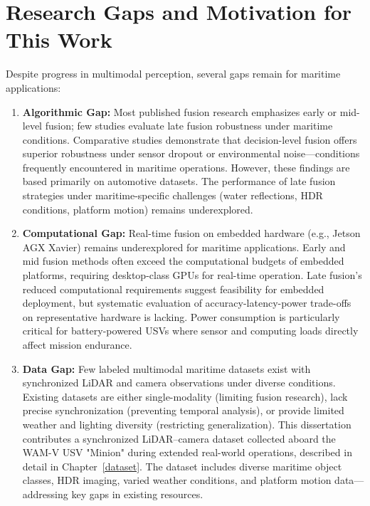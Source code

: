 \documentclass{erauthesis}
\begin{document}

\section{Research Gaps and Motivation for This Work}

Despite progress in multimodal perception, several gaps remain for maritime applications:

\begin{enumerate}
    \item \textbf{Algorithmic Gap:} Most published fusion research emphasizes early or mid-level fusion; few studies evaluate late fusion robustness under maritime conditions. Comparative studies \cite{liang2022, xu2023} demonstrate that decision-level fusion offers superior robustness under sensor dropout or environmental noise—conditions frequently encountered in maritime operations. However, these findings are based primarily on automotive datasets. The performance of late fusion strategies under maritime-specific challenges (water reflections, HDR conditions, platform motion) remains underexplored.
    
    \item \textbf{Computational Gap:} Real-time fusion on embedded hardware (e.g., Jetson AGX Xavier) remains underexplored for maritime applications. Early and mid fusion methods often exceed the computational budgets of embedded platforms, requiring desktop-class GPUs for real-time operation. Late fusion's reduced computational requirements suggest feasibility for embedded deployment, but systematic evaluation of accuracy-latency-power trade-offs on representative hardware is lacking. Power consumption is particularly critical for battery-powered USVs where sensor and computing loads directly affect mission endurance.
    
    \item \textbf{Data Gap:} Few labeled multimodal maritime datasets exist with synchronized LiDAR and camera observations under diverse conditions. Existing datasets are either single-modality (limiting fusion research), lack precise synchronization (preventing temporal analysis), or provide limited weather and lighting diversity (restricting generalization). This dissertation contributes a synchronized LiDAR–camera dataset collected aboard the WAM-V USV "Minion" during extended real-world operations, described in detail in Chapter~\ref{dataset}. The dataset includes diverse maritime object classes, HDR imaging, varied weather conditions, and platform motion data—addressing key gaps in existing resources.
\end{enumerate}
\end{document}
